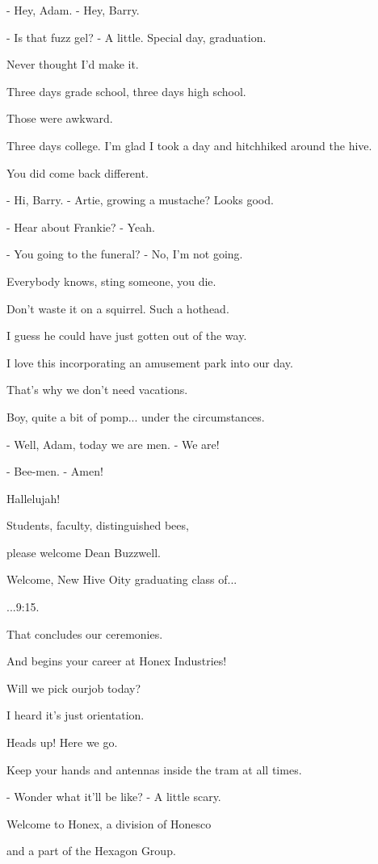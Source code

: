 \documentclass[journal]{IEEEtran}
\begin{document}
  
- Hey, Adam.
- Hey, Barry.

  
- Is that fuzz gel?
- A little. Special day, graduation.

  
Never thought I'd make it.

  
Three days grade school,
three days high school.

  
Those were awkward.

  
Three days college. I'm glad I took
a day and hitchhiked around the hive.

  
You did come back different.

  
- Hi, Barry.
- Artie, growing a mustache? Looks good.

  
- Hear about Frankie?
- Yeah.

  
- You going to the funeral?
- No, I'm not going.

  
Everybody knows,
sting someone, you die.

  
Don't waste it on a squirrel.
Such a hothead.

  
I guess he could have
just gotten out of the way.

  
I love this incorporating
an amusement park into our day.

  
That's why we don't need vacations.

  
Boy, quite a bit of pomp...
under the circumstances.

  
- Well, Adam, today we are men.
- We are!

  
- Bee-men.
- Amen!

  
Hallelujah!

  
Students, faculty, distinguished bees,

  
please welcome Dean Buzzwell.

  
Welcome, New Hive Oity
graduating class of...

  
...9:15.

  
That concludes our ceremonies.

  
And begins your career
at Honex Industries!

  
Will we pick ourjob today?

  
I heard it's just orientation.

  
Heads up! Here we go.

  
Keep your hands and antennas
inside the tram at all times.

  
- Wonder what it'll be like?
- A little scary.

  
Welcome to Honex,
a division of Honesco

  
and a part of the Hexagon Group.
\end{document}
